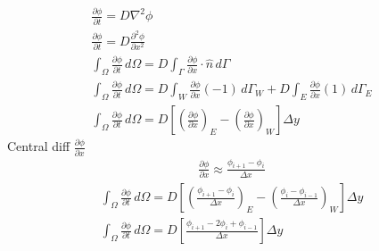 \documentclass[a4paper, 11pt,article,oneside]{memoir}%
\begin{document}
\begin{gather*}
\frac{\partial \phi}{\partial t}=D\nabla^2\phi\\
\frac{\partial \phi}{\partial t}=D\frac{\partial^2\phi}{\partial x^2}\\
\int_\Omega \frac{\partial \phi}{\partial t}\, d\Omega=D\int_\Gamma \frac{\partial\phi}{\partial x}\cdot \hat{n} \,d\Gamma\\
\int_\Omega \frac{\partial \phi}{\partial t}\, d\Omega=D\int_W \frac{\partial\phi}{\partial x}(-1) \,d\Gamma_W+D\int_E \frac{\partial\phi}{\partial x}(1) \,d\Gamma_E\\
\int_\Omega \frac{\partial \phi}{\partial t}\, d\Omega=D\left[ \left(\frac{\partial \phi}{\partial x}\right)_E-\left(\frac{\partial \phi}{\partial x}\right)_W\right] \Delta y 
\end{gather*}
Central diff $\frac{\partial \phi}{\partial x}$
\begin{gather*}
\frac{\partial\phi}{\partial x}\approx\frac{\phi_{i+1}-\phi_{i}}{\Delta x}
\end{gather*}
\begin{gather*}
\int_\Omega \frac{\partial \phi}{\partial t}\, d\Omega=D\left[ \left(\frac{\phi_{i+1}-\phi_{i}}{\Delta x}\right)_E-\left(\frac{\phi_{i}-\phi_{i-1}}{\Delta x}\right)_W\right] \Delta y \\
\int_\Omega \frac{\partial \phi}{\partial t}\, d\Omega=D\left[ \frac{\phi_{i+1}-2\phi_{i}+\phi_{i-1}}{\Delta x}\right] \Delta y \\
\end{gather*}
\end{document}
